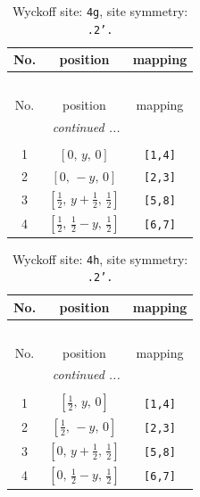 \documentclass[fleqn,8pt]{jsarticle}
\begin{document}
\renewcommand{\arraystretch}{1.2}
\begin{longtable}{ccc}
\caption{Wyckoff site: {\tt 4g}, site symmetry: {\tt .2'.}}
 \\
 \hline \hline
No. & position & mapping \\ \hline \endfirsthead

\multicolumn{2}{l}{\tablename\ \thetable{}} \\
 \hline \hline
No. & position & mapping \\ \hline \endhead

 \hline \hline
\multicolumn{2}{r}{\footnotesize\it continued ...} \\ \endfoot

 \hline \hline
\multicolumn{2}{r}{} \\ \endlastfoot

1 & $\left[ 0,\, y,\, 0 \right]$ & {\tt [1,4]} \\ \hline
2 & $\left[ 0,\, - y,\, 0 \right]$ & {\tt [2,3]} \\ \hline
3 & $\left[ \frac{1}{2},\, y + \frac{1}{2},\, \frac{1}{2} \right]$ & {\tt [5,8]} \\ \hline
4 & $\left[ \frac{1}{2},\, \frac{1}{2} - y,\, \frac{1}{2} \right]$ & {\tt [6,7]} \\
\end{longtable}
\renewcommand{\arraystretch}{1.2}
\begin{longtable}{ccc}
\caption{Wyckoff site: {\tt 4h}, site symmetry: {\tt .2'.}}
 \\
 \hline \hline
No. & position & mapping \\ \hline \endfirsthead

\multicolumn{2}{l}{\tablename\ \thetable{}} \\
 \hline \hline
No. & position & mapping \\ \hline \endhead

 \hline \hline
\multicolumn{2}{r}{\footnotesize\it continued ...} \\ \endfoot

 \hline \hline
\multicolumn{2}{r}{} \\ \endlastfoot

1 & $\left[ \frac{1}{2},\, y,\, 0 \right]$ & {\tt [1,4]} \\ \hline
2 & $\left[ \frac{1}{2},\, - y,\, 0 \right]$ & {\tt [2,3]} \\ \hline
3 & $\left[ 0,\, y + \frac{1}{2},\, \frac{1}{2} \right]$ & {\tt [5,8]} \\ \hline
4 & $\left[ 0,\, \frac{1}{2} - y,\, \frac{1}{2} \right]$ & {\tt [6,7]} \\
\end{longtable}
\end{document}
